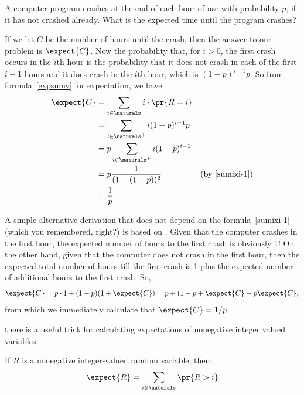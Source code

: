 A computer program crashes at the end of each hour of use with probability
$p$, if it has not crashed already.  What is the expected time until the
program crashes?

If we let $C$ be the number of hours until the crash, then the answer to
our problem is $\expect{C}$.  Now the probability that, for $i >0$, the
first crash occurs in the $i$th hour is the probability that it does not
crash in each of the first $i-1$ hours and it does crash in the $i$th
hour, which is $(1-p)^{i-1}p$.  So from formula~\eqref{expsumv} for
expectation, we have
\begin{align*}
\expect{C} & = \sum_{i \in \naturals} i \cdot \pr{R=i}\\
           & = \sum_{i \in \naturals^+} i (1-p)^{i-1}p\\
           &= p \sum_{i \in \naturals^+} i (1-p)^{i-1}\\
           &= p\frac{1}{(1-(1-p))^2} & \text{(by~\eqref{sumixi-1})}\\
           &= \frac{1}{p}
\end{align*}


A simple alternative derivation that does not depend on
the formula~\eqref{sumixi-1}
(which you remembered, right?) is based on .  Given that the computer crashes in the first hour, the
expected number of hours to the first crash is obviously 1!  On the other
hand, given that the computer does not crash in the first hour, then the
expected total number of hours till the first crash is 1 plus the expected
number of additional hours to the first crash.  So,
\[
\expect{C} = p\cdot 1 + (1-p)(1+ \expect{C}) = p + (1 - p + \expect{C} -p\expect{C},
\]
from which we immediately calculate that $\expect{C} = 1/p$.

\iffalse
there is a useful trick for
calculating expectations of nonegative integer valued variables:
\begin{lemma}
If $R$ is a nonegative integer-valued random variable, then:
%
\begin{equation}\label{R>i}
\expect{R} = \sum_{i \in \naturals} \pr{R > i}
\end{equation}
\end{lemma}

